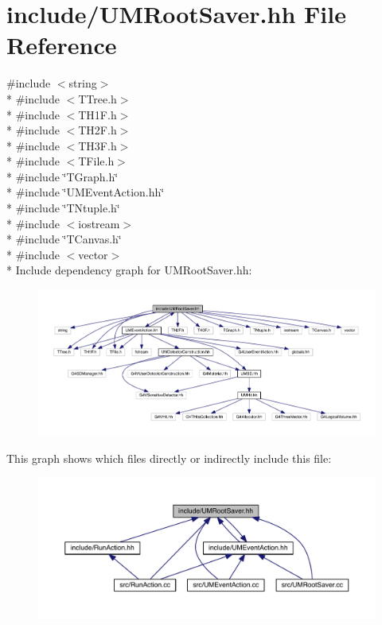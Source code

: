 \hypertarget{UMRootSaver_8hh}{}\section{include/\+U\+M\+Root\+Saver.hh File Reference}
\label{UMRootSaver_8hh}
{\ttfamily \#include $<$string$>$}\\*
{\ttfamily \#include $<$T\+Tree.\+h$>$}\\*
{\ttfamily \#include $<$T\+H1\+F.\+h$>$}\\*
{\ttfamily \#include $<$T\+H2\+F.\+h$>$}\\*
{\ttfamily \#include $<$T\+H3\+F.\+h$>$}\\*
{\ttfamily \#include $<$T\+File.\+h$>$}\\*
{\ttfamily \#include \char`\"{}T\+Graph.\+h\char`\"{}}\\*
{\ttfamily \#include \char`\"{}U\+M\+Event\+Action.\+hh\char`\"{}}\\*
{\ttfamily \#include \char`\"{}T\+Ntuple.\+h\char`\"{}}\\*
{\ttfamily \#include $<$iostream$>$}\\*
{\ttfamily \#include \char`\"{}T\+Canvas.\+h\char`\"{}}\\*
{\ttfamily \#include $<$vector$>$}\\*
Include dependency graph for U\+M\+Root\+Saver.\+hh\+:
\nopagebreak
\begin{figure}[H]
\begin{center}
\leavevmode
\includegraphics[width=350pt]{UMRootSaver_8hh__incl}
\end{center}
\end{figure}
This graph shows which files directly or indirectly include this file\+:
\nopagebreak
\begin{figure}[H]
\begin{center}
\leavevmode
\includegraphics[width=350pt]{UMRootSaver_8hh__dep__incl}
\end{center}
\end{figure}
